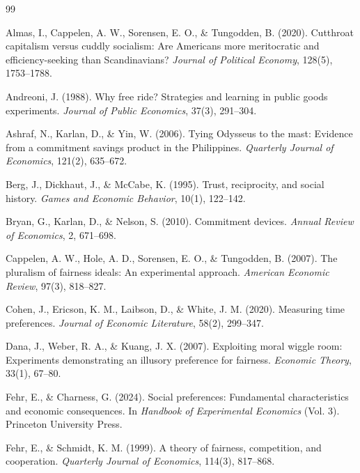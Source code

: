 \documentclass[12pt]{article}
\begin{document}
\begin{thebibliography}{99}

Almas, I., Cappelen, A. W., Sorensen, E. O., \& Tungodden, B. (2020).
Cutthroat capitalism versus cuddly socialism: Are Americans more meritocratic and efficiency-seeking than Scandinavians?
\textit{Journal of Political Economy}, 128(5), 1753--1788.

Andreoni, J. (1988).
Why free ride? Strategies and learning in public goods experiments.
\textit{Journal of Public Economics}, 37(3), 291--304.

Ashraf, N., Karlan, D., \& Yin, W. (2006).
Tying Odysseus to the mast: Evidence from a commitment savings product in the Philippines.
\textit{Quarterly Journal of Economics}, 121(2), 635--672.

Berg, J., Dickhaut, J., \& McCabe, K. (1995).
Trust, reciprocity, and social history.
\textit{Games and Economic Behavior}, 10(1), 122--142.

Bryan, G., Karlan, D., \& Nelson, S. (2010).
Commitment devices.
\textit{Annual Review of Economics}, 2, 671--698.

Cappelen, A. W., Hole, A. D., Sorensen, E. O., \& Tungodden, B. (2007).
The pluralism of fairness ideals: An experimental approach.
\textit{American Economic Review}, 97(3), 818--827.

Cohen, J., Ericson, K. M., Laibson, D., \& White, J. M. (2020).
Measuring time preferences.
\textit{Journal of Economic Literature}, 58(2), 299--347.

Dana, J., Weber, R. A., \& Kuang, J. X. (2007).
Exploiting moral wiggle room: Experiments demonstrating an illusory preference for fairness.
\textit{Economic Theory}, 33(1), 67--80.

Fehr, E., \& Charness, G. (2024).
Social preferences: Fundamental characteristics and economic consequences.
In \textit{Handbook of Experimental Economics} (Vol. 3). Princeton University Press.

Fehr, E., \& Schmidt, K. M. (1999).
A theory of fairness, competition, and cooperation.
\textit{Quarterly Journal of Economics}, 114(3), 817--868.


\end{thebibliography}
\end{document}
